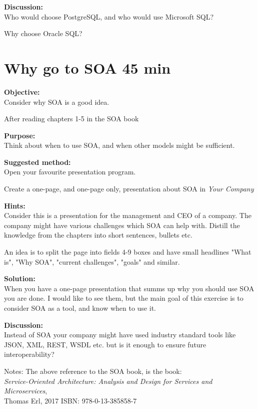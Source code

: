 \documentclass[a4paper,11pt,notitlepage]{report}
\begin{document}
{\bf Discussion:}\\
Who would choose PostgreSQL, and who would use Microsoft SQL?

Why choose Oracle SQL?


\chapter{Why go to SOA 45 min}
\label{ex:why-soa}


{\bf Objective:}\\
Consider why SOA is a good idea.

After reading chapters 1-5 in the SOA book


{\bf Purpose:}\\
Think about when to use SOA, and when other models might be sufficient.

{\bf Suggested method:}\\
Open your favourite presentation program.

Create a one-page, and one-page only, presentation about SOA in \emph{Your Company}

{\bf Hints:}\\
Consider this is a presentation for the management and CEO of a company. The company might have various challenges which SOA can help with. Distill the knowledge from the chapters into short sentences, bullets etc.

An idea is to split the page into fields 4-9 boxes and have small headlines "What is", "Why SOA", "current challenges", "goals" and similar.

{\bf Solution:}\\
When you have a one-page presentation that summs up why you should use SOA you are done. I would like to see them, but the main goal of this exercise is to consider SOA as a tool, and know when to use it.

{\bf Discussion:}\\
Instead of SOA your company might have used industry standard tools like JSON, XML, REST, WSDL etc. but is it enough to ensure future interoperability?

Notes: The above reference to the SOA book, is the book:\\
\emph{Service-Oriented Architecture: Analysis and Design for Services and Microservices},\\ Thomas Erl, 2017
ISBN: 978-0-13-385858-7
\end{document}
